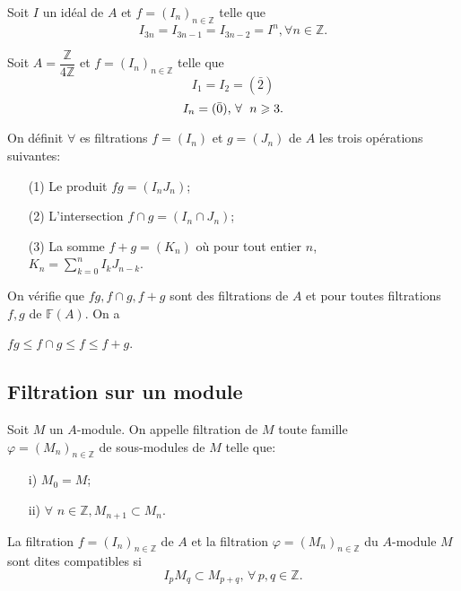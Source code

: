 \begin{monexemple}
		\item 	Soit $I$ un idéal de $A$ et $f=(I_n)_{n \in \mathbb{Z}}$ telle que
		$$I_{3n} = I_{3n-1} = I_{3n-2} =I^{n},  \forall   n \in \mathbb{Z}. $$
		\item 	Soit $A = \dfrac{\mathbb{Z}}{4 \mathbb{Z}} $ et $f=(I_n)_{n \in \mathbb{Z}}$ telle que
		$$I_1 = I_2 = (\bar{2})$$
		$$I_n = (\bar{0})  \text{, $ \forall $ } \; n \geqslant 3. $$
\end{monexemple}
\begin{madefinition}
	On définit $ \forall $ es filtrations $f=(I_n)$ et $g=(J_n)$ de $A$ les trois opérations suivantes: 
	\begin{enumerate}
		\item[(1)] Le produit $fg=(I_nJ_n)$;
		\item[(2)] L'intersection $f \cap g = (I_n \cap J_n)$;
		\item[(3)] La somme $f+g=(K_n)$ où pour tout entier $n$, \\ $K_n =\displaystyle  \sum_{k=0}^{n}I_{k}J_{n-k} $.
	\end{enumerate}
	On vérifie que $fg, f \cap g, f + g$ sont des filtrations de $A$ et pour toutes filtrations \\ $f,g$ de $\mathbb{F}(A)$. On a
	\begin{center}
		$fg \leqslant f \cap g \leqslant f \leqslant f+g$.
	\end{center}
\end{madefinition}

\subsection{Filtration sur un module}
\begin{madefinition}
	Soit $M$ un $A$-module. On appelle filtration de $M$ toute famille \\ $\varphi = (M_n)_{n \in \mathbb{Z}}$ de sous-modules de $M$ telle que:
	\begin{enumerate}
		\item[i)] $M_0 = M$;
		\item[ii)] $ \forall $  $n \in \mathbb{Z}, M_{n+1} \subset M_n$.
	\end{enumerate}
	
	La filtration $f = (I_n)_{n \in \mathbb{Z}}$ de $A$ et la filtration $\varphi = (M_n)_{n \in \mathbb{Z}}$ du $A$-module $M$ sont dites compatibles si
	\[ I_p M_q \subset M_{p+q} ,\, \forall \, p, q \in \mathbb{Z}. \]
\end{madefinition}
